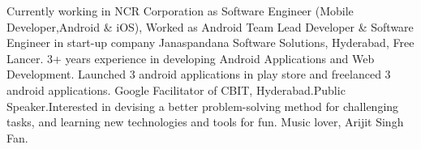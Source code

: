 

\begin{cvparagraph}

Currently working in NCR Corporation as Software Engineer (Mobile Developer,Android \& iOS), Worked as Android Team Lead Developer \& Software Engineer in start-up company Janaspandana Software Solutions, Hyderabad, Free Lancer. 3+ years experience  in developing Android Applications and Web Development. Launched 3 android applications in play store and freelanced 3 android applications. Google Facilitator of CBIT, Hyderabad.Public Speaker.Interested in devising a better problem-solving method for challenging tasks, and learning new technologies and tools for fun. Music lover, Arijit Singh Fan.\newline
\end{cvparagraph}
